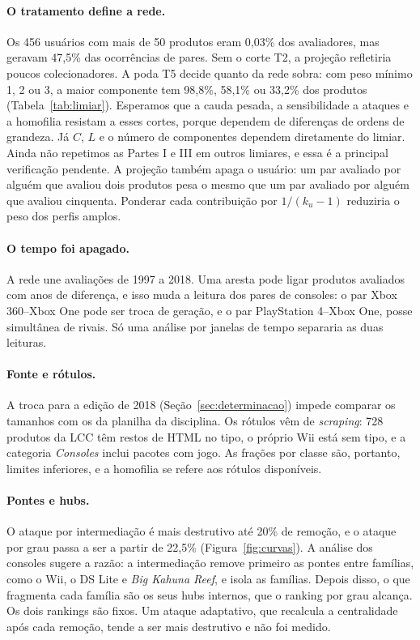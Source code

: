 \documentclass[sigconf,nonacm]{webmedia}
\begin{document}
\paragraph{O tratamento define a rede.}
Os 456 usuários com mais de 50 produtos eram 0,03\% dos avaliadores,
mas geravam 47,5\% das ocorrências de pares. Sem o corte T2, a
projeção refletiria poucos colecionadores. A poda T5 decide quanto da
rede sobra: com peso mínimo 1, 2 ou 3, a maior componente tem 98,8\%,
58,1\% ou 33,2\% dos produtos (Tabela~\ref{tab:limiar}). Esperamos
que a cauda pesada, a sensibilidade a ataques e a homofilia resistam a
esses cortes, porque dependem de diferenças de ordens de grandeza.
Já \(C\), \(L\) e o número de componentes dependem diretamente do
limiar. Ainda não repetimos as Partes I e III em outros limiares, e
essa é a principal verificação pendente. A projeção também apaga o
usuário: um par avaliado por alguém que avaliou dois produtos pesa o
mesmo que um par avaliado por alguém que avaliou cinquenta. Ponderar
cada contribuição por \(1/(k_u-1)\) reduziria o peso dos perfis
amplos.

\paragraph{O tempo foi apagado.}
A rede une avaliações de 1997 a 2018. Uma aresta pode ligar produtos
avaliados com anos de diferença, e isso muda a leitura dos pares de consoles: o par
Xbox 360--Xbox One pode ser troca de geração, e o par PlayStation
4--Xbox One, posse simultânea de rivais. Só uma análise por janelas
de tempo separaria as duas leituras.

\paragraph{Fonte e rótulos.}
A troca para a edição de 2018 (Seção~\ref{sec:determinacao}) impede comparar os tamanhos
com os da planilha da disciplina. Os rótulos vêm de
\emph{scraping}: 728 produtos da LCC têm restos de HTML no tipo, o
próprio Wii está sem tipo, e a categoria \emph{Consoles} inclui
pacotes com jogo. As frações por classe são, portanto, limites
inferiores, e a homofilia se refere aos rótulos disponíveis.

\paragraph{Pontes e hubs.}
O ataque por intermediação é mais destrutivo até 20\% de remoção, e o
ataque por grau passa a ser a partir de 22,5\%
(Figura~\ref{fig:curvas}). A análise dos consoles sugere a razão: a intermediação
remove primeiro as pontes entre famílias, como o Wii, o DS Lite e
\emph{Big Kahuna Reef}, e isola as famílias. Depois disso, o que
fragmenta cada família são os seus hubs internos, que o ranking por
grau alcança. Os dois rankings são fixos. Um ataque adaptativo, que
recalcula a centralidade após cada remoção, tende a ser mais
destrutivo e não foi medido.
\end{document}

